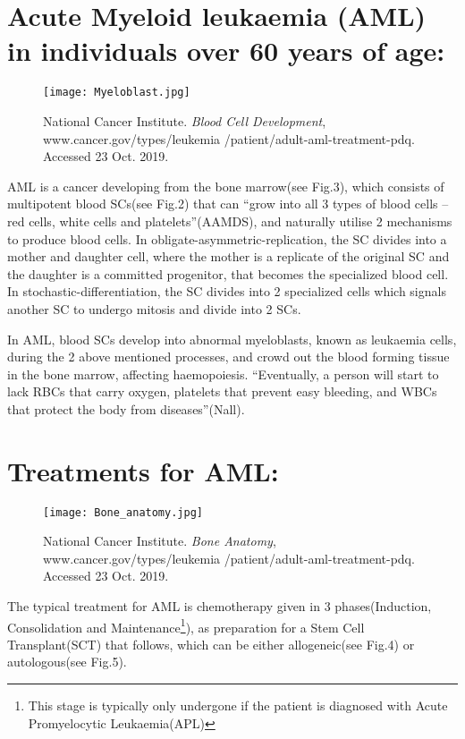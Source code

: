 \documentclass[11pt, a4]{article}
\begin{document}
		\section{Acute Myeloid leukaemia (AML) in individuals over 60 years of age:}
			
			\begin{wrapfigure}{r}{5 cm}
				\centering
				\texttt{[image: Myeloblast.jpg]}
				\caption{\footnotesize National Cancer Institute. \textit{Blood Cell Development}, www.cancer.gov/types/leukemia
					/patient/adult-aml-treatment-pdq. Accessed 23 Oct. 2019.}
				\vspace{-20pt}
			\end{wrapfigure}
			
			AML is a cancer developing from the bone marrow(see Fig.3), which consists of multipotent blood SCs(see Fig.2) that  can ``grow into all 3 types of blood cells – red cells, white cells and platelets''(AAMDS), and naturally utilise 2 mechanisms to produce blood cells. In obligate-asymmetric-replication, the SC divides into a mother and daughter cell, where the mother is a replicate of the original SC and the daughter is a committed progenitor, that becomes the specialized blood cell. In stochastic-differentiation, the SC divides into 2 specialized cells which signals another SC to undergo mitosis and divide into 2 SCs.
				
			\bigbreak
				
			In AML, blood SCs develop into abnormal myeloblasts, known as leukaemia cells, during the 2 above mentioned processes, and crowd out the blood forming tissue in the bone marrow, affecting haemopoiesis. ``Eventually, a person will start to lack RBCs that carry oxygen, platelets that prevent easy bleeding, and WBCs that protect the body from diseases''(Nall).
				\newpage
		\section{Treatments for AML:}
			\begin{wrapfigure}{r}{4.5 cm}
				\centering
				\texttt{[image: Bone\_anatomy.jpg]}
				\caption{\footnotesize National Cancer Institute. \textit{Bone Anatomy}, www.cancer.gov/types/leukemia
					/patient/adult-aml-treatment-pdq. Accessed 23 Oct. 2019.}
				\vspace{-50pt}
			\end{wrapfigure}
			
			The typical treatment for AML is chemotherapy given in 3 phases(Induction, Consolidation and Maintenance\footnote{This stage is typically only undergone if the patient is diagnosed with \newline Acute Promyelocytic Leukaemia(APL)}), as preparation for a Stem Cell Transplant(SCT) that follows, which can be either allogeneic(see Fig.4) or autologous(see Fig.5).
			
\end{document}
